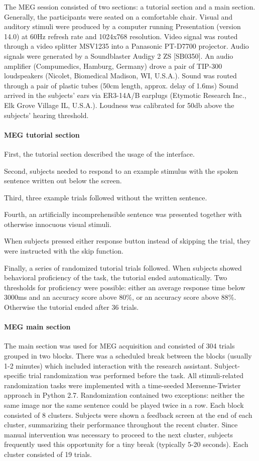 The MEG session consisted of two sections: a tutorial section and a main section.
Generally, the participants were seated on a comfortable chair.
Visual and auditory stimuli were produced by a computer running Presentation (version 14.0) at 60Hz refresh rate and 1024x768 resolution.
Video signal was routed through a video splitter MSV1235 into a Panasonic PT-D7700 projector.
Audio signals were generated by a Soundblaster Audigy 2 ZS [SB0350].
An audio amplifier (Compumedics, Hamburg, Germany) drove a pair of TIP-300 loudspeakers (Nicolet, Biomedical Madison, WI, U.S.A.).
Sound was routed through a pair of plastic tubes (50cm length, approx. delay of 1.6ms)
Sound arrived in the subjects' ears via ER3-14A/B earplugs (Etymotic Research Inc., Elk Grove Village IL, U.S.A.).
Loudness was calibrated for 50db above the subjects' hearing threshold.

\paragraph{MEG tutorial section}

First, the tutorial section described the usage of the interface.

Second, subjects needed to respond to an example stimulus with the spoken sentence written out below the screen.

Third, three example trials followed without the written sentence.

Fourth, an artificially incomprehensible sentence was presented together with otherwise innocuous visual stimuli.

When subjects pressed either response button instead of skipping the trial, they were instructed with the skip function.

Finally, a series of randomized tutorial trials followed.
When subjects showed behavioral proficiency of the task, the tutorial ended automatically.
Two thresholds for proficiency were possible: either an average response time below 3000ms and an accuracy score above 80\%, or an accuracy score above 88\%.
Otherwise the tutorial ended after 36 trials.

\paragraph{MEG main section}
The main section was used for MEG acquisition and consisted of 304 trials grouped in two blocks.
There was a scheduled break between the blocks (usually 1-2 minutes) which included interaction with the research assistant.
Subject-specific trial randomization was performed before the task.
All stimuli-related randomization tasks were implemented with a time-seeded Mersenne-Twister approach in Python 2.7.
Randomization contained two exceptions: neither the same image nor the same sentence could be played twice in a row.
Each block consisted of 8 clusters.
Subjects were shown a feedback screen at the end of each cluster, summarizing their performance throughout the recent cluster.
Since manual intervention was necessary to proceed to the next cluster, subjects frequently used this opportunity for a tiny break (typically 5-20 seconds).
Each cluster consisted of 19 trials.

